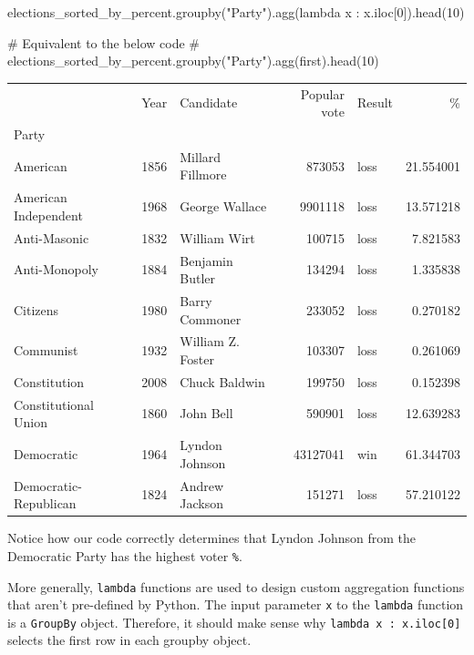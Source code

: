 \documentclass[
  letterpaper,
  DIV=11,
  numbers=noendperiod]{scrreprt}
\newenvironment{Shaded}{\begin{snugshade}}{\end{snugshade}}
\newcommand{\CommentTok}[1]{\textcolor[rgb]{0.37,0.37,0.37}{#1}}
\newcommand{\DecValTok}[1]{\textcolor[rgb]{0.68,0.00,0.00}{#1}}
\newcommand{\KeywordTok}[1]{\textcolor[rgb]{0.00,0.23,0.31}{#1}}
\newcommand{\NormalTok}[1]{\textcolor[rgb]{0.00,0.23,0.31}{#1}}
\newcommand{\StringTok}[1]{\textcolor[rgb]{0.13,0.47,0.30}{#1}}
\begin{document}
\begin{Shaded}
\begin{Highlighting}[]
\NormalTok{elections\_sorted\_by\_percent.groupby(}\StringTok{"Party"}\NormalTok{).agg(}\KeywordTok{lambda}\NormalTok{ x : x.iloc[}\DecValTok{0}\NormalTok{]).head(}\DecValTok{10}\NormalTok{)}

\CommentTok{\# Equivalent to the below code}
\CommentTok{\# elections\_sorted\_by\_percent.groupby("Party").agg(\textquotesingle{}first\textquotesingle{}).head(10)}
\end{Highlighting}
\end{Shaded}

\begin{tabular}{lrlrlr}
\toprule
{} &  Year &          Candidate &  Popular vote & Result &          \% \\
Party                 &       &                    &               &        &            \\
\midrule
American              &  1856 &   Millard Fillmore &        873053 &   loss &  21.554001 \\
American Independent  &  1968 &     George Wallace &       9901118 &   loss &  13.571218 \\
Anti-Masonic          &  1832 &       William Wirt &        100715 &   loss &   7.821583 \\
Anti-Monopoly         &  1884 &    Benjamin Butler &        134294 &   loss &   1.335838 \\
Citizens              &  1980 &     Barry Commoner &        233052 &   loss &   0.270182 \\
Communist             &  1932 &  William Z. Foster &        103307 &   loss &   0.261069 \\
Constitution          &  2008 &      Chuck Baldwin &        199750 &   loss &   0.152398 \\
Constitutional Union  &  1860 &          John Bell &        590901 &   loss &  12.639283 \\
Democratic            &  1964 &     Lyndon Johnson &      43127041 &    win &  61.344703 \\
Democratic-Republican &  1824 &     Andrew Jackson &        151271 &   loss &  57.210122 \\
\bottomrule
\end{tabular}

Notice how our code correctly determines that Lyndon Johnson from the
Democratic Party has the highest voter \texttt{\%}.

More generally, \texttt{lambda} functions are used to design custom
aggregation functions that aren't pre-defined by Python. The input
parameter \texttt{x} to the \texttt{lambda} function is a
\texttt{GroupBy} object. Therefore, it should make sense why
\texttt{lambda\ x\ :\ x.iloc{[}0{]}} selects the first row in each
groupby object.
\end{document}
